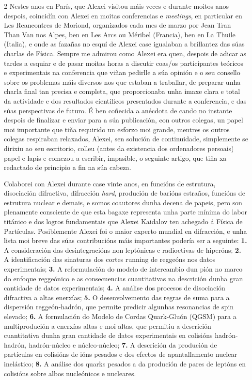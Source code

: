 \begin{refsection}
\begin{multicols}{2}
Nestes anos en París, que Alexei visitou máis veces e durante moitos anos
despois, coincidín con Alexei en moitas conferencias e \textit{meetings}, en
particular en Les Reancontres de Moriond, organizados cada mes de marzo por
Jean Tran Than Van nos Alpes, ben en Les Arcs ou Méribel (Francia), ben en La
Thuile (Italia), e onde as fazañas no esquí de Alexei case igualaban a
brillantez das súas charlas de Física. Sempre me admirou como Alexei era quen,
despois de adicar as tardes a esquiar e de pasar moitas horas a discutir
coas/os participantes teóricos e experimentais na conferencia que viñan
pedirlle a súa opinión e o seu consello sobre os problemas máis diversos nos
que estaban a traballar, de preparar unha charla final tan precisa e completa,
que proporcionaba unha imaxe clara e total da actividade e dos resultados
científicos presentados durante a conferencia, e das súas perspectivas de
futuro. É ben coñecida a anécdota de cando no instante despois de finalizar e
enviar para a súa publicación, con outros colegas, un papel moi importante que
tiña requirido un esforzo moi grande, mentres os outros colegas respiraban
relaxados, Alexei, sen solución de continuidade, simplemente se dirixiu ao seu
escritorio, colleu (antes da existencia dos ordenadores persoais) papel e lapis
e comezou a escribir, impasible, o seguinte artigo, que tiña xa redactado de
principio a fin na súa cabeza.

Colaborei con Alexei durante case vinte anos, en funcións de estrutura,
disociación difractiva, difracción \textit{hard}, produción de barións
estraños, funcións de estrutura nuclear e demais, e somos coautores dunha
decena de papeis, pero son plenamente consciente de que esta bagaxe representa
unha parte mínima do labor titánico e dos logros fundamentais que Alexei
Kaidalov ten achegado á Física de Partículas. Posiblemente Alexei foi o maior
experto mundial en difracción, e unha lista moi breve das súas contribucións
máis importantes podería ser a seguinte: \textbf{1.} A consideración das
desintegracións non-leptónicas e radioctivas de hiperóns; \textbf{2.} A
identificación das sinaturas dos cortes running de reggeóns nos datos
experimentais; \textbf{3.} A reformulación do modelo de intercambio dun pión no
marco do enfoque reggeónico e as consecuencias cuantitativas na descrición
dunha gran cantidade de datos experimentais; \textbf{4.} A análise dos procesos
de disociación difractiva a altas enerxías; \textbf{5.} O desenvolvemento das
regras de suma para a dispersión reggeón-hadrón, que permite predicir algunhas
resonancias de spin elevado; \textbf{6.} A formulación do Modelo de Cordas
Quark-Gluón (QGSM) para a multiprodución a enerxías altas e moi altas, que
permitiu a descrición cuantitativa dunha gran cantidade de datos experimentais
en colisións hadrón-hadrón, hadrón-núcleo e núcleo-núcleo; \textbf{7.} A
descrición da produción de partículas en colisións de ións pesados e dos
efectos de apantallamento nuclear inelástico; \textbf{8.} A análise dos quarks
pesados a da produción de pares de leptóns en colisións sobre albos nucleónicos
e nucleares.


\end{multicols}
\end{refsection}
